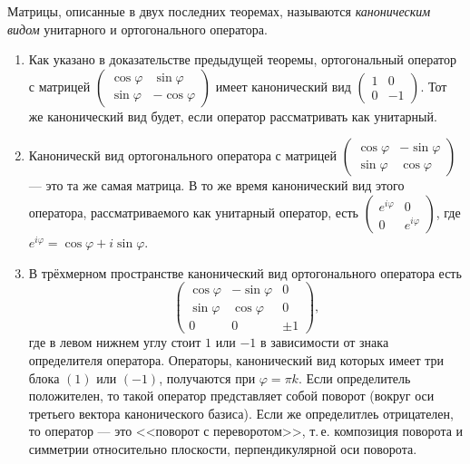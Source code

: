 Матрицы, описанные в двух последних теоремах, называются \textit{каноническим видом} унитарного и ортогонального оператора.

\begin{example}
    \begin{enumerate}
        \item Как указано в доказательстве предыдущей теоремы, ортогональный оператор с матрицей
            $
            \begin{pmatrix}
                \cos\varphi & \sin\varphi\\
                \sin\varphi & -\cos\varphi
            \end{pmatrix}
            $ имеет канонический вид
            $
            \begin{pmatrix}
                1 & 0\\
                0 & -1
            \end{pmatrix}
            $. Тот же канонический вид будет, если оператор рассматривать как унитарный.
        \item Каноническй вид ортогонального оператора с матрицей
            $
            \begin{pmatrix}
                \cos\varphi & -\sin\varphi\\
                \sin\varphi & \cos\varphi
            \end{pmatrix}
            $ --- это та же самая матрица. В то же время канонический вид этого оператора, рассматриваемого как унитарный оператор, есть
            $
            \begin{pmatrix}
                e^{i\varphi} & 0\\
                0 & e^{i\varphi}
            \end{pmatrix}
            $, где $e^{i\varphi} = \cos\varphi + i\sin\varphi$.
        \item В трёхмерном пространстве канонический вид ортогонального оператора есть
            \[
                \begin{pmatrix}
                    \cos\varphi & -\sin\varphi & 0\\
                    \sin\varphi & \cos\varphi & 0\\
                    0 & 0 & \pm 1
                \end{pmatrix},
            \]
            где в левом нижнем углу стоит $1$ или $-1$ в зависимости от знака определителя оператора. Операторы, канонический вид которых имеет три блока $(1)$ или $(-1)$, получаются при $\varphi = \pi k$. Если определитель положителен, то такой оператор представляет собой поворот (вокруг оси третьего вектора канонического базиса). Если же определитлеь отрицателен, то оператор --- это <<поворот с переворотом>>, т.\,е. композиция поворота и симметрии относительно плоскости, перпендикулярной оси поворота.


\end{enumerate}
\end{example}

